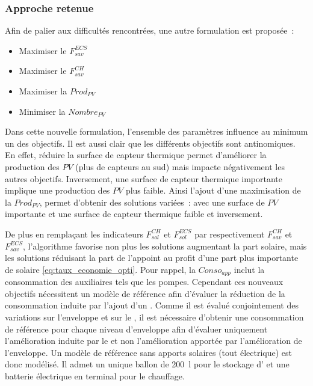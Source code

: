 \subsubsection{Approche retenue} %
\label{ssub:approche_retenue}
\noindent Afin de palier aux difficultés rencontrées, une autre formulation est proposée~:
\begin{itemize}
  \item Maximiser le $F_{sav}^{ECS}$
  \item Maximiser le $F_{sav}^{CH}$
  \item Maximiser la $Prod_{PV}$
  \item Minimiser la $Nombre_{PV}$
\end{itemize}

Dans cette nouvelle formulation, l’ensemble des paramètres influence au minimum un des
objectifs. Il est aussi clair que les différents objectifs sont antinomiques.
En effet, réduire la surface de capteur thermique permet d’améliorer la production des
$PV$ (plus de capteurs au sud) mais impacte négativement les autres objectifs.
Inversement, une surface de capteur thermique importante implique une production des $PV$
plus faible. Ainsi l’ajout d’une maximisation de la $Prod_{PV}$, permet d’obtenir des
solutions variées~: avec une surface de $PV$ importante et une surface de capteur
thermique faible et inversement.

De plus en remplaçant les indicateurs $F_{sol}^{CH}$ et $F_{sol}^{ECS}$ par respectivement
$F_{sav}^{CH}$ et $F_{sav}^{ECS}$, l’algorithme favorise non plus les solutions augmentant
la part solaire, mais les solutions réduisant la part de l’appoint au profit d’une part
plus importante de solaire \eqref{eq:taux_economie_opti}. Pour rappel, la $Conso_{app}$
inclut la consommation des auxiliaires tels que les pompes. Cependant ces nouveaux
objectifs nécessitent un modèle de référence afin d’évaluer la réduction de la
consommation induite par l’ajout d’un . Comme il est évalué conjointement des
variations sur l’enveloppe et sur le , il est nécessaire d’obtenir une
consommation de référence pour chaque niveau d’enveloppe afin d’évaluer uniquement
l’amélioration induite par le  et non l’amélioration apportée par l’amélioration
de l’enveloppe. Un modèle de référence sans apports solaires (tout électrique) est donc
modélisé. Il admet un unique ballon de \SI{200}{\litre} pour le stockage d’ et
une batterie électrique en terminal pour le chauffage.

